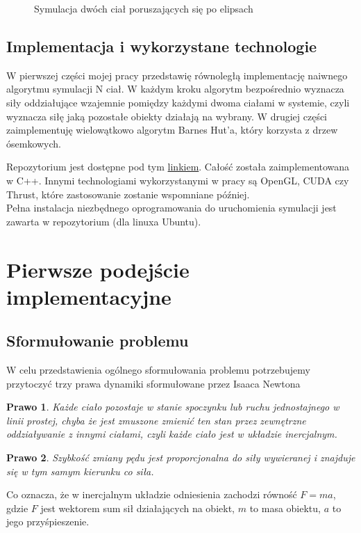 \documentclass[14pt,twoside,a4paper]{article}
\newtheorem{theorem}{Prawo}
\begin{document}
\begin{figure}
    \centering
    \def\svgwidth{\columnwidth}
    
    \caption{Symulacja dwóch ciał poruszających się po elipsach}
\end{figure}


\subsection{\Large Implementacja i wykorzystane technologie}
W pierwszej części mojej pracy przedstawię równoległą implementację naiwnego algorytmu symulacji N ciał. W każdym kroku algorytm bezpośrednio wyznacza siły oddziałujące wzajemnie pomiędzy każdymi dwoma ciałami w systemie, czyli wyznacza siłę jaką pozostałe obiekty działają na wybrany. W drugiej części zaimplementuję wielowątkowo algorytm Barnes Hut'a, który korzysta z drzew ósemkowych.

Repozytorium jest dostępne pod tym \href{https://github.com/damian1996/N-Body-Simulation}{linkiem}.
Całość została zaimplementowana w C++. Innymi technologiami wykorzystanymi w pracy są OpenGL, CUDA czy Thrust, które zastosowanie zostanie wspomniane później. \\
Pełna instalacja niezbędnego oprogramowania do uruchomienia symulacji jest zawarta w repozytorium (dla linuxa Ubuntu).

\section{\LARGE Pierwsze podejście implementacyjne}
\bigskip

\subsection{\Large Sformułowanie problemu}
W celu przedstawienia ogólnego sformułowania problemu potrzebujemy przytoczyć trzy prawa dynamiki sformułowane przez Isaaca Newtona \cite{fund}

\begin{theorem}
Każde ciało pozostaje w stanie spoczynku lub ruchu jednostajnego w linii prostej, chyba że jest zmuszone zmienić ten stan przez zewnętrzne oddziaływanie z innymi ciałami, czyli każde ciało jest w układzie inercjalnym.
\end{theorem}

\begin{theorem}
Szybkość zmiany pędu jest proporcjonalna do siły wywieranej i znajduje się w tym samym kierunku co siła.
\end{theorem}
Co oznacza, że w inercjalnym układzie odniesienia zachodzi równość $F=ma$, gdzie $F$ jest wektorem sum sił działających na obiekt, $m$ to masa obiektu, $a$ to jego przyśpieszenie.
\end{document}
